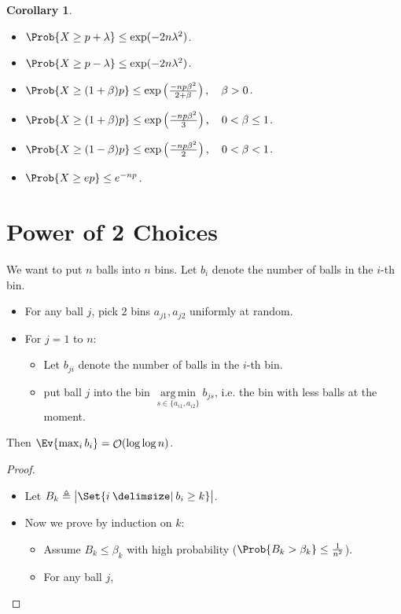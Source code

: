 \documentclass[a4paper]{article}
\DeclarePairedDelimiter{\abs}{\lvert}{\rvert}
\DeclareMathOperator*{\argmin}{arg\,min}
\DeclareMathOperator{\Ord}{\mathcal{O}}
\providecommand\given{}
\newcommand*\SetSymbol[1][]{%
  \nonscript\:#1\vert
  \allowbreak
  \nonscript\:
\mathopen{}}
\renewcommand\given{\SetSymbol[\delimsize]}
\renewcommand\given{\SetSymbol[\delimsize]}
\theoremstyle{mystyle}
\newtheorem{coro}{Corollary}
\begin{document}
\begin{coro} \mbox{}
  \begin{itemize}
    \item $\Prob{X \ge p + \lambda} \le \exp(-2n\lambda^2)$.
    \item $\Prob{X \ge p - \lambda} \le \exp(-2n\lambda^2)$.
    \item $\Prob{X \ge (1+\beta)p} \le \exp\left(\frac{-np\beta^2}{2+\beta}\right),
      \quad \beta > 0$.
    \item $\Prob{X \ge (1+\beta)p} \le \exp\left(\frac{-np\beta^2}{3}\right),
      \quad 0 < \beta \le 1$.
    \item $\Prob{X \ge (1-\beta)p} \le \exp\left(\frac{-np\beta^2}{2}\right),
      \quad 0 < \beta < 1$.
    \item $\Prob{X \ge ep} \le e^{-np}$.
  \end{itemize}
\end{coro}

\section{Power of 2 Choices}
We want to put $n$ balls into $n$ bins.
Let $b_i$ denote the number of balls in the $i$-th bin.
\begin{itemize}
  \item For any ball $j$, pick $2$ bins $a_{j1}, a_{j2}$ uniformly at random.
  \item For $j = 1$ to $n$:
    \begin{itemize}
      \item Let $b_{ji}$ denote the number of balls in the $i$-th bin.
      \item put ball $j$ into the bin $\argmin\limits_{s \in \{ a_{i1}, a_{i2} \}} b_{js}$,
        i.e. the bin with less balls at the moment.
    \end{itemize}
\end{itemize}
Then $\Ev{ \max_i b_i } = \Ord(\log \log n)$.

\begin{proof} \mbox{}
  \begin{itemize}
    \item Let $B_k \triangleq \abs[\big ]{\Set{ i \given b_i \ge k }}$.
    \item Now we prove by induction on $k$:
      \begin{itemize}
        \item Assume $B_k \le \beta_k$ with high probability
          ($\Prob{B_k > \beta_k} \le \frac{1}{n^2}$).
        \item For any ball $j$, 
      \end{itemize}
  \end{itemize}
\end{proof}
\end{document}

